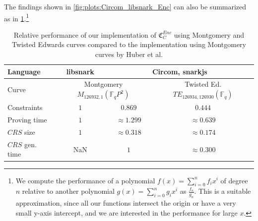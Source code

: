 The findings shown in \cref{fig:plots:Circom_libsnark_Enc} can also be summarized as in \cref{tab:encryptionResults}.\footnote{
    \label{footnote:compareFunctions}
    We compute the performance of a polynomial $f(x)=\sum\limits_{i=0}^{n} f_ix^{i}$ of degree $n$ relative to another polynomial $g(x)=\sum\limits_{i=0}^{n}g_ix^{i}$ as $\frac{f_n}{g_n}$.
    This is a suitable approximation, since all our functions intersect the origin or have a very small y-axis intercept, and we are interested in the performance for large $x$.
}

\begin{table}[h]
    \centering
    \begin{tabular}{|l|c|c|c|}
        \hline
        Language & libsnark & \multicolumn{2}{c|}{Circom, snarkjs}\\
        \hline
        Curve & \multicolumn{2}{c|}{Montgomery $M_{126932, 1}(\mathbb{F}_qP^2)$} & Twisted Ed. $TE_{126934, 126930}(\mathbb{F}_q)$\\
        \hline
        \hline
        Constraints & $1$ & $0.869$ & $0.444$\\
        Proving time & $1$ & $\approx1.299$ & $\approx0.639$ \\
        $CRS$ size & $1$ & $\approx0.318$ & $\approx0.174$ \\
        $CRS$ gen. time & NaN & $1$ & $\approx0.300$ \\
        \hline
    \end{tabular}
    \caption{Relative performance of our implementation of $\mathfrak{C}_{C}^{Enc}$ using Montgomery and Twisted Edwards curves compared to the implementation using Montgomery curves by Huber et al.}
    \label{tab:encryptionResults}
\end{table}


